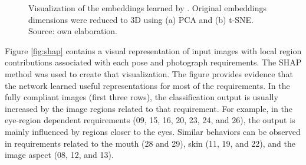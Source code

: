 \begin{figure}[ht]
\centering
{}
\caption{Visualization of the embeddings learned by \methodname. Original embeddings dimensions were reduced to 3D using (a) PCA and (b) t-SNE. Source: own elaboration.}
\label{fig:embviz}
\end{figure}

Figure \ref{fig:shap} contains a visual representation of input images with local region contributions associated with each pose and photograph requirements. The SHAP \citep{shap2018} method was used to create that visualization. The figure provides evidence that the network learned useful representations for most of the requirements. In the fully compliant images (first three rows), the classification output is usually increased by the image regions related to that requirement. For example, in the eye-region dependent requirements (09, 15, 16, 20, 23, 24, and 26), the output is mainly influenced by regions closer to the eyes. Similar behaviors can be observed in requirements related to the mouth (28 and 29), skin (11, 19, and 22), and the image aspect (08, 12, and 13). 

